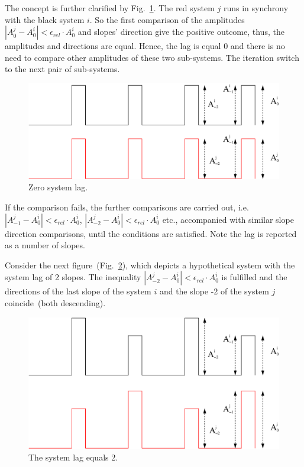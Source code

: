 \documentclass[11pt,a4paper]{article}
\begin{document}
The concept is further clarified by Fig.~\ref{fig:nd_lag0}. The red system $j$ runs
in synchrony with the black system $i$. So the first comparison of the amplitudes
$\left|A_0^j - A_0^i\right| < \epsilon_{rel}\cdot A_0^i$ and slopes' direction give
the positive outcome, thus, the amplitudes and directions are equal. Hence, the lag
is equal 0 and there is no need to compare other amplitudes of these two
sub-systems. The iteration switch to the next pair of sub-systems.

\begin{figure}[h]
  \centering
  \includegraphics[scale=0.45]{nd_lag0}
  \caption{Zero system lag.}
  \label{fig:nd_lag0}
\end{figure}

If the comparison fails, the further comparisons are carried out,
i.e. $\left|A_{-1}^j - A_0^i\right| < \epsilon_{rel}\cdot A_0^i$, $\left|A_{-2}^j -
  A_0^i\right| < \epsilon_{rel}\cdot A_0^i$ etc., accompanied with similar slope
direction comparisons, until the conditions are satisfied. Note the lag is reported
as a number of slopes.

Consider the next figure~(Fig.~\ref{fig:nd_lag2}), which depicts a hypothetical
system with the system lag of 2 slopes. The inequality $\left|A_{-2}^j - A_0^i\right|
< \epsilon_{rel}\cdot A_0^i$ is fulfilled and the directions of the last slope of the
system $i$ and the slope -2 of the system $j$ coincide~(both descending).

\begin{figure}[h]
  \centering
  \includegraphics[scale=0.45]{nd_lag2}
  \caption{The system lag equals 2.}
  \label{fig:nd_lag2}
\end{figure}
\end{document}
